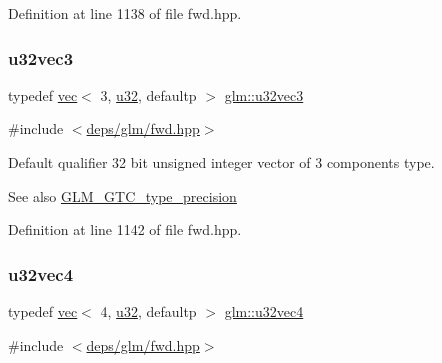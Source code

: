 Definition at line 1138 of file fwd.\+hpp.

\mbox{\label{group__gtc__type__precision_ga342e504c37b635393e6747b85147151f}} 
\subsubsection{\texorpdfstring{u32vec3}{u32vec3}}
{\footnotesize\ttfamily typedef \hyperlink{structglm_1_1vec}{vec}$<$ 3, \hyperlink{group__gtc__type__precision_ga54e837745059fd29017bed71cfa0a8db}{u32}, defaultp $>$ \hyperlink{group__gtc__type__precision_ga342e504c37b635393e6747b85147151f}{glm\+::u32vec3}}



{\ttfamily \#include $<$\hyperlink{fwd_8hpp}{deps/glm/fwd.\+hpp}$>$}

Default qualifier 32 bit unsigned integer vector of 3 components type. \begin{DoxySeeAlso}{See also}
\hyperlink{group__gtc__type__precision}{G\+L\+M\+\_\+\+G\+T\+C\+\_\+type\+\_\+precision} 
\end{DoxySeeAlso}


Definition at line 1142 of file fwd.\+hpp.

\mbox{\label{group__gtc__type__precision_gad3f72b91c5b7efbc377625c44433824d}} 
\subsubsection{\texorpdfstring{u32vec4}{u32vec4}}
{\footnotesize\ttfamily typedef \hyperlink{structglm_1_1vec}{vec}$<$ 4, \hyperlink{group__gtc__type__precision_ga54e837745059fd29017bed71cfa0a8db}{u32}, defaultp $>$ \hyperlink{group__gtc__type__precision_gad3f72b91c5b7efbc377625c44433824d}{glm\+::u32vec4}}



{\ttfamily \#include $<$\hyperlink{fwd_8hpp}{deps/glm/fwd.\+hpp}$>$}

